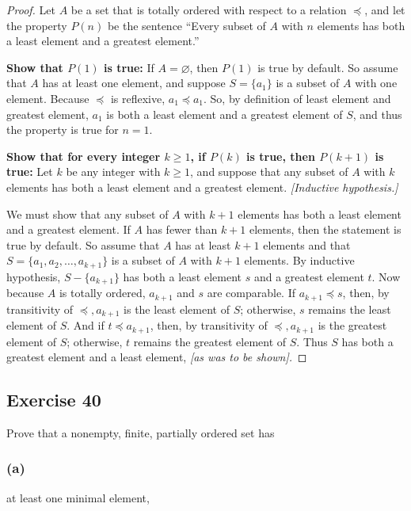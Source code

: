 \documentclass[14pt]{extarticle}
\newcommand{\es}{\varnothing}
\begin{document}
\begin{proof}
Let $A$ be a set that is totally ordered with respect to a relation \(\preceq\), and let the property \(P(n)\) be the 
sentence “Every subset of $A$ with $n$ elements has both a least element and a greatest element.”

{\bf Show that \(P(1)\) is true:} If \(A = \es\), then \(P(1)\) is true by default. So assume that \(A\) has at 
least one element, and suppose \(S = \{a_1\}\) is a subset of \(A\) with one element. Because \(\preceq\) is 
reflexive, \(a_1 \preceq a_1\). So, by definition of least element and greatest element, \(a_1\) is both a least 
element and a greatest element of \(S\), and thus the property is true for \(n = 1\).

{\bf Show that for every integer \(k \geq 1\), if \(P(k)\) is true, then \(P(k + 1)\) is true:} Let $k$ be any integer 
with \(k \geq 1\), and suppose that any subset of $A$ with $k$ elements has both a least element and a greatest 
element. {\it [Inductive hypothesis.]} 

We must show that any subset of $A$ with \(k + 1\) elements has both a least element and a greatest element. If $A$ has 
fewer than \(k + 1\) elements, then the statement is true by default. So assume that $A$ has at least \(k + 1\) 
elements and that \(S = \{a_1, a_2, \ldots, a_{k+1}\}\) is a subset of $A$ with \(k + 1\) elements. By inductive 
hypothesis, \(S - \{a_{k+1}\}\) has both a least element $s$ and a greatest element $t$. Now because $A$ is totally 
ordered, \(a_{k+1}\) and $s$ are comparable. If \(a_{k+1} \preceq s\), then, by transitivity of \(\preceq, a_{k+1}\) 
is the least element of $S$; otherwise, $s$ remains the least element of $S$. And if \(t \preceq a_{k+1}\), then, 
by transitivity of \(\preceq, a_{k+1}\) is the greatest element of $S$; otherwise, $t$ remains the greatest element 
of $S$. Thus $S$ has both a greatest element and a least element, {\it [as was to be shown].}
\end{proof}

\subsection{Exercise 40}
Prove that a nonempty, finite, partially ordered set has

\subsubsection{(a)}
at least one minimal element,
\end{document}
